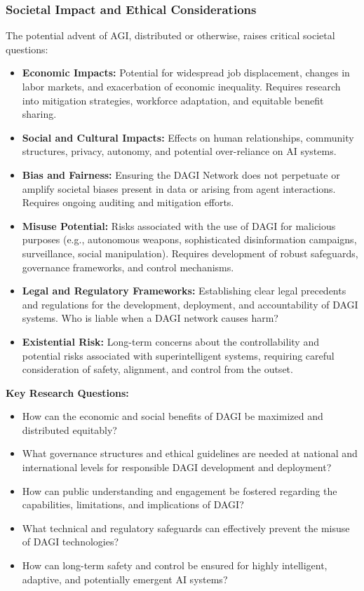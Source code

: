 \documentclass[12pt]{amsart}
\begin{document}
\subsubsection{Societal Impact and Ethical Considerations}
\label{subsubsec:societal_impact}
The potential advent of AGI, distributed or otherwise, raises critical societal questions:
\begin{itemize}[leftmargin=*]
    \item \textbf{Economic Impacts:} Potential for widespread job displacement, changes in labor markets, and exacerbation of economic inequality. Requires research into mitigation strategies, workforce adaptation, and equitable benefit sharing.
    \item \textbf{Social and Cultural Impacts:} Effects on human relationships, community structures, privacy, autonomy, and potential over-reliance on AI systems.
    \item \textbf{Bias and Fairness:} Ensuring the DAGI Network does not perpetuate or amplify societal biases present in data or arising from agent interactions. Requires ongoing auditing and mitigation efforts.
    \item \textbf{Misuse Potential:} Risks associated with the use of DAGI for malicious purposes (e.g., autonomous weapons, sophisticated disinformation campaigns, surveillance, social manipulation). Requires development of robust safeguards, governance frameworks, and control mechanisms.
    \item \textbf{Legal and Regulatory Frameworks:} Establishing clear legal precedents and regulations for the development, deployment, and accountability of DAGI systems. Who is liable when a DAGI network causes harm?
    \item \textbf{Existential Risk:} Long-term concerns about the controllability and potential risks associated with superintelligent systems, requiring careful consideration of safety, alignment, and control from the outset.
\end{itemize}
\textbf{Key Research Questions:}
\begin{itemize}[leftmargin=*, label={--}]
    \item How can the economic and social benefits of DAGI be maximized and distributed equitably?
    \item What governance structures and ethical guidelines are needed at national and international levels for responsible DAGI development and deployment?
    \item How can public understanding and engagement be fostered regarding the capabilities, limitations, and implications of DAGI?
    \item What technical and regulatory safeguards can effectively prevent the misuse of DAGI technologies?
    \item How can long-term safety and control be ensured for highly intelligent, adaptive, and potentially emergent AI systems?
\end{itemize}
\end{document}
